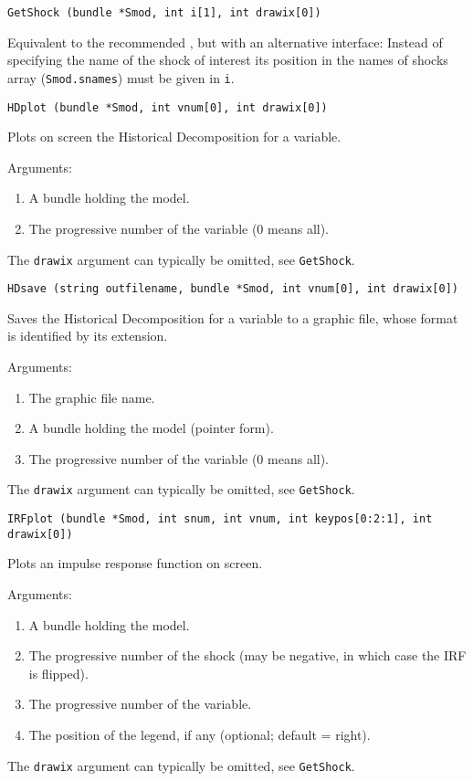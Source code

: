 \documentclass[a4paper,10pt]{article}
\newenvironment{funcdoc}[1]
{\noindent\hrulefill\newline\nopagebreak\texttt{#1}%
\nopagebreak\par\noindent\hrulefill%
\nopagebreak\par\nopagebreak\smallskip\nopagebreak\par}
{\bigskip}
\newcommand{\dtk}[1]{\texttt{\detokenize{#1}}}
\begin{document}
\begin{funcdoc}{GetShock (bundle *Smod, int i[1], int drawix[0])}
  \noindent Equivalent to the recommended \dtk{SVAR_getshock}, but with an alternative
  interface: 
  Instead of specifying the name of the shock of interest its position in the 
  names of shocks array (\texttt{Smod.snames}) must be given in \texttt{i}.
\end{funcdoc}

\begin{funcdoc}{HDplot (bundle *Smod, int vnum[0], int drawix[0])}
  \noindent Plots on screen the Historical Decomposition for a variable. 
  
   \noindent Arguments:
  \begin{enumerate}
  \item A bundle holding the model.
  \item The progressive number of the variable (0 means all).
  \end{enumerate}
  
  The \texttt{drawix} argument can typically be omitted, see \texttt{GetShock}.
\end{funcdoc}

\begin{funcdoc}{HDsave (string outfilename, bundle *Smod, int vnum[0], int drawix[0])}
    \noindent Saves the Historical Decomposition for a variable to a graphic file,
  whose format is identified by its extension. 
  
   \noindent Arguments:
  \begin{enumerate}
  \item The graphic file name.
  \item A bundle holding the model (pointer form).
  \item The progressive number of the variable (0 means all).
  \end{enumerate}
  
  The \texttt{drawix} argument can typically be omitted, see \texttt{GetShock}.
\end{funcdoc}

\begin{funcdoc}{IRFplot (bundle *Smod, int snum, int vnum, int keypos[0:2:1], int drawix[0])}
  \noindent Plots an impulse response function on screen. 
  
   \noindent Arguments:
  
  \begin{enumerate}
  \item A bundle holding the model.
  \item The progressive number of the shock (may be negative, in which
    case the IRF is flipped).
  \item The progressive number of the variable.
  \item The position of the legend, if any (optional; default = right).
  \end{enumerate}
  
   The \texttt{drawix} argument can typically be omitted, see \texttt{GetShock}.
\end{funcdoc}
\end{document}
